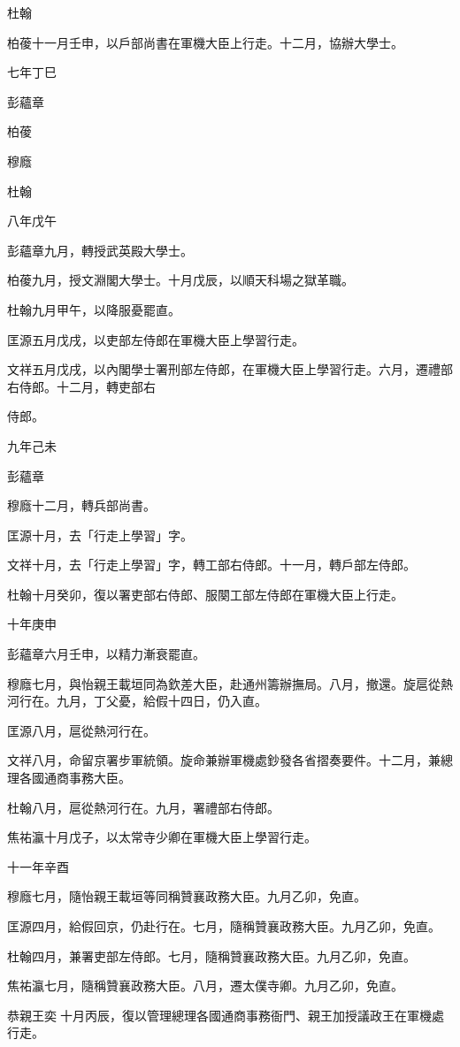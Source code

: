 \begin{pinyinscope}
杜翰

柏葰十一月壬申，以戶部尚書在軍機大臣上行走。十二月，協辦大學士。

七年丁巳

彭蘊章

柏葰

穆廕

杜翰

八年戊午

彭蘊章九月，轉授武英殿大學士。

柏葰九月，授文淵閣大學士。十月戊辰，以順天科場之獄革職。

杜翰九月甲午，以降服憂罷直。

匡源五月戊戌，以吏部左侍郎在軍機大臣上學習行走。

文祥五月戊戌，以內閣學士署刑部左侍郎，在軍機大臣上學習行走。六月，遷禮部右侍郎。十二月，轉吏部右

侍郎。

九年己未

彭蘊章

穆廕十二月，轉兵部尚書。

匡源十月，去「行走上學習」字。

文祥十月，去「行走上學習」字，轉工部右侍郎。十一月，轉戶部左侍郎。

杜翰十月癸卯，復以署吏部右侍郎、服闋工部左侍郎在軍機大臣上行走。

十年庚申

彭蘊章六月壬申，以精力漸衰罷直。

穆廕七月，與怡親王載垣同為欽差大臣，赴通州籌辦撫局。八月，撤還。旋扈從熱河行在。九月，丁父憂，給假十四日，仍入直。

匡源八月，扈從熱河行在。

文祥八月，命留京署步軍統領。旋命兼辦軍機處鈔發各省摺奏要件。十二月，兼總理各國通商事務大臣。

杜翰八月，扈從熱河行在。九月，署禮部右侍郎。

焦祐瀛十月戊子，以太常寺少卿在軍機大臣上學習行走。

十一年辛酉

穆廕七月，隨怡親王載垣等同稱贊襄政務大臣。九月乙卯，免直。

匡源四月，給假回京，仍赴行在。七月，隨稱贊襄政務大臣。九月乙卯，免直。

杜翰四月，兼署吏部左侍郎。七月，隨稱贊襄政務大臣。九月乙卯，免直。

焦祐瀛七月，隨稱贊襄政務大臣。八月，遷太僕寺卿。九月乙卯，免直。

恭親王奕十月丙辰，復以管理總理各國通商事務衙門、親王加授議政王在軍機處行走。


\end{pinyinscope}

